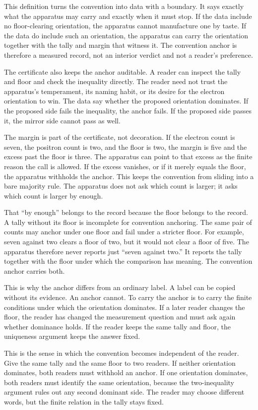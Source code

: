 This definition turns the convention into data with a boundary. It says exactly
what the apparatus may carry and exactly when it must stop. If the data include
no floor-clearing orientation, the apparatus cannot manufacture one by taste.
If the data do include such an orientation, the apparatus can carry the
orientation together with the tally and margin that witness it. The convention
anchor is therefore a measured record, not an interior verdict and not a
reader's preference.

The certificate also keeps the anchor auditable. A reader can inspect the tally
and floor and check the inequality directly. The reader need not trust the
apparatus's temperament, its naming habit, or its desire for the electron
orientation to win. The data say whether the proposed orientation dominates.
If the proposed side fails the inequality, the anchor fails. If the proposed
side passes it, the mirror side cannot pass as well.

The margin is part of the certificate, not decoration. If the electron count is
seven, the positron count is two, and the floor is two, the margin is five and
the excess past the floor is three. The apparatus can point to that excess as
the finite reason the call is allowed. If the excess vanishes, or if it merely
equals the floor, the apparatus withholds the anchor. This keeps the convention
from sliding into a bare majority rule. The apparatus does not ask which count
is larger; it asks which count is larger by enough.

That ``by enough'' belongs to the record because the floor belongs to the
record. A tally without its floor is incomplete for convention anchoring. The
same pair of counts may anchor under one floor and fail under a stricter floor.
For example, seven against two clears a floor of two, but it would not clear a
floor of five. The apparatus therefore never reports just ``seven against
two.'' It reports the tally together with the floor under which the comparison
has meaning. The convention anchor carries both.

This is why the anchor differs from an ordinary label. A label can be copied
without its evidence. An anchor cannot. To carry the anchor is to carry the
finite conditions under which the orientation dominates. If a later reader
changes the floor, the reader has changed the measurement question and must ask
again whether dominance holds. If the reader keeps the same tally and floor,
the uniqueness argument keeps the answer fixed.

This is the sense in which the convention becomes independent of the reader.
Give the same tally and the same floor to two readers. If neither orientation
dominates, both readers must withhold an anchor. If one orientation dominates,
both readers must identify the same orientation, because the two-inequality
argument rules out any second dominant side. The reader may choose different
words, but the finite relation in the tally stays fixed.

